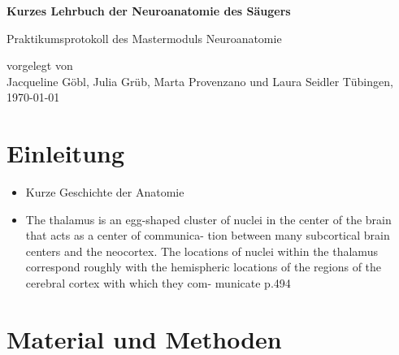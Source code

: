 \documentclass[12pt,a4paper,pdftex]{article}
\begin{document}
\setlength{\parindent}{0pt}


\begin{titlepage}
 \begin{center}
        \vspace*{1cm}
        \LARGE
        \textbf{Kurzes Lehrbuch der Neuroanatomie des Säugers}
        \vspace{2cm}
        
        \Large
        Praktikumsprotokoll des Mastermoduls Neuroanatomie
        \vspace{4cm}
        
        \large
        vorgelegt von \\ Jacqueline Göbl, Julia Grüb, Marta Provenzano und Laura Seidler %
        \vfill
        \large     
        T\"ubingen, \today
    \end{center}
    \newpage
        \thispagestyle{empty}
        \mbox{}
        \newpage
\end{titlepage}


\thispagestyle{empty}
\mbox{}

\tableofcontents
\newpage
\listoffigures


\newpage
\section{Einleitung}
\begin{itemize}
    \item Kurze Geschichte der Anatomie
    \item The thalamus is an egg-shaped cluster of nuclei in the
center of the brain that acts as a center of communica-
tion between many subcortical brain centers and the
neocortex. The locations of nuclei within the thalamus
correspond roughly with the hemispheric locations of
the regions of the cerebral cortex with which they com-
municate \cite[Kap.~22]{kandel2013principles} p.494
\end{itemize}
\newpage
\section{Material und Methoden}
\end{document}
